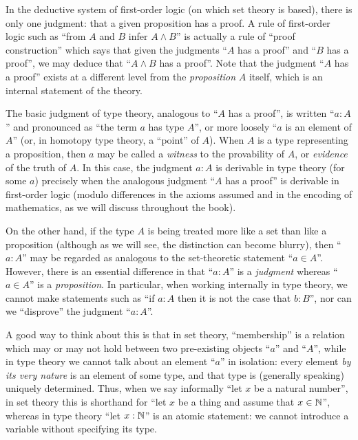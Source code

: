 In the deductive system of first-order logic (on which set theory is based), there is only one judgment: that a given proposition has a proof.
A rule of first-order logic such as ``from $A$ and $B$ infer $A\wedge B$'' is actually a rule of ``proof construction'' which says that given the judgments ``$A$ has a proof'' and ``$B$ has a proof'', we may deduce that ``$A\wedge B$ has a proof''.
Note that the judgment ``$A$ has a proof'' exists at a different level from the \emph{proposition} $A$ itself, which is an internal statement of the theory.

The basic judgment of type theory, analogous to ``$A$ has a proof'', is written ``$a:A$'' and pronounced as ``the term $a$ has type $A$'', or more loosely ``$a$ is an element of $A$'' (or, in homotopy type theory, a ``point'' of $A$).
When $A$ is a type representing a proposition, then $a$ may be called a \emph{witness} to the provability of $A$, or \emph{evidence} of the truth of $A$.
In this case, the judgment $a:A$ is derivable in type theory (for some $a$) precisely when the analogous judgment ``$A$ has a proof'' is derivable in first-order logic (modulo differences in the axioms assumed and in the encoding of mathematics, as we will discuss throughout the book).

On the other hand, if the type $A$ is being treated more like a set than like a proposition (although as we will see, the distinction can become blurry), then ``$a:A$'' may be regarded as analogous to the set-theoretic statement ``$a\in A$''.
However, there is an essential difference in that ``$a:A$'' is a \emph{judgment} whereas ``$a\in A$'' is a \emph{proposition}.
In particular, when working internally in type theory, we cannot make statements such as ``if $a:A$ then it is not the case that $b:B$'', nor can we ``disprove'' the judgment ``$a:A$''.

A good way to think about this is that in set theory, ``membership'' is a relation which may or may not hold between two pre-existing objects ``$a$'' and ``$A$'', while in type theory we cannot talk about an element ``$a$'' in isolation: every element \emph{by its very nature} is an element of some type, and that type is (generally speaking) uniquely determined.
Thus, when we say informally ``let $x$ be a natural number'', in set theory this is shorthand for ``let $x$ be a thing and assume that $x\in\mathbb{N}$'', whereas in type theory ``let $x:\mathbb{N}$'' is an atomic statement: we cannot introduce a variable without specifying its type.

